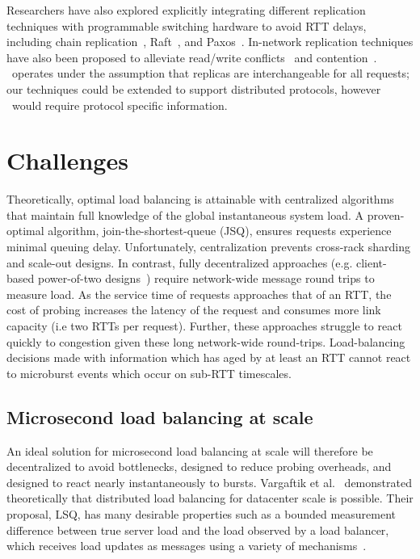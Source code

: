 Researchers have also explored explicitly integrating different
replication techniques with programmable switching hardware to avoid
RTT delays, including chain replication~\cite{netchain},
Raft~\cite{hovercraft}, and Paxos~\cite{nopaxos}.  In-network
replication techniques have also been proposed to alleviate
read/write conflicts~\cite{harmonia} and
contention~\cite{pegasus}. \toolname\ operates under the assumption
that replicas are interchangeable for all requests; our
techniques could be extended to support distributed protocols, however
\toolname\ would require protocol specific information.

\section{Challenges}
\label{sec:challenges}

Theoretically, optimal load balancing is attainable with centralized
algorithms~\cite{jsq_fcfs} that maintain full knowledge of the global
instantaneous system load.  A proven-optimal algorithm,
join-the-shortest-queue (JSQ), ensures requests experience minimal
queuing delay.  Unfortunately, centralization prevents cross-rack
sharding and scale-out designs.  In contrast, fully decentralized
approaches (e.g. client-based power-of-two designs~\cite{power_of_2})
require network-wide message round trips to measure load. As the
service time of requests approaches that of an RTT, the cost of
probing increases the latency of the request and consumes more link
capacity (i.e two RTTs per request). Further, these approaches
struggle to react quickly to congestion given these long network-wide
round-trips. Load-balancing decisions made with information which has
aged by at least an RTT cannot react to microburst events which occur
on sub-RTT timescales.

\subsection{Microsecond load balancing at scale}

An ideal solution for microsecond load balancing at scale will therefore be
decentralized to avoid bottlenecks, designed to reduce probing overheads, and
designed to react nearly instantaneously to bursts.
Vargaftik et al.~\cite{lsq} demonstrated theoretically that distributed
load balancing for datacenter scale is possible. Their proposal, LSQ, has many
desirable properties such as a bounded measurement difference between true
server load and the load observed by a load balancer, which receives load
updates as messages using a variety of mechanisms~\cite{lsq}. 

